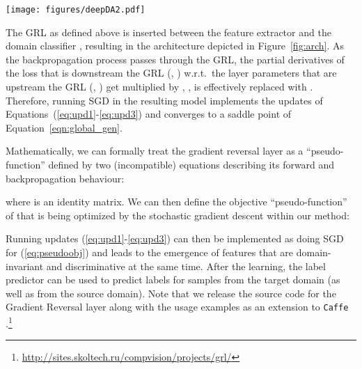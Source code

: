 \documentclass[twoside,11pt]{article}
\newcommand{\fig}[1]{Figure~\ref{fig:#1}}
\newcommand{\eq}[1]{(\ref{eq:#1})}
\begin{document}
\begin{figure*}[t]
 \centering
 \texttt{[image: figures/deepDA2.pdf]}
 \caption{The {\bf proposed architecture} includes a deep {\em feature extractor} (green) and a deep {\em label predictor} (blue), which together form a standard feed-forward architecture. Unsupervised domain adaptation is achieved by adding a {\em domain classifier} (red) connected to the feature extractor via a {\em gradient reversal layer} that multiplies the gradient by a certain negative constant during the backpropagation-based training. Otherwise, the training proceeds standardly and minimizes the label prediction loss (for source examples) and the domain classification loss (for all samples). Gradient reversal ensures that the feature distributions over the two domains are made similar (as indistinguishable as possible for the domain classifier), thus resulting in the domain-invariant features.}
 \label{fig:arch}
 \end{figure*}
 

The GRL as defined above is inserted between the feature extractor  and the domain classifier , resulting in the architecture depicted in \fig{arch}. As the backpropagation process passes through the GRL, the partial derivatives of the loss that is downstream the GRL (\ie, ) w.r.t.\ the layer parameters that are upstream the GRL (\ie, ) get multiplied by , \ie,  is effectively replaced with . Therefore, running SGD in the resulting model implements the updates of Equations~(\ref{eq:upd1}-\ref{eq:upd3}) and converges to a saddle point of Equation~\eqref{eqn:global_gen}.

Mathematically, we can formally treat the gradient reversal layer as a ``pseudo-function''  defined by two (incompatible) equations describing its forward and backpropagation behaviour:

where  is an identity matrix.
We can then define the objective ``pseudo-function'' of  that is being optimized by the stochastic gradient descent within our method:


Running updates (\ref{eq:upd1}-\ref{eq:upd3}) can then be implemented as doing SGD for \eq{pseudoobj} and leads to the emergence of features that are domain-invariant and discriminative at the same time. After the learning, the label predictor  can be used to predict labels for samples from the target domain (as well as from the source domain).
Note that we release the source code for
the Gradient Reversal layer along with the usage examples
as an extension to \texttt{Caffe} \citep{Jia14}.\footnote{\url{http://sites.skoltech.ru/compvision/projects/grl/}}
\end{document}
